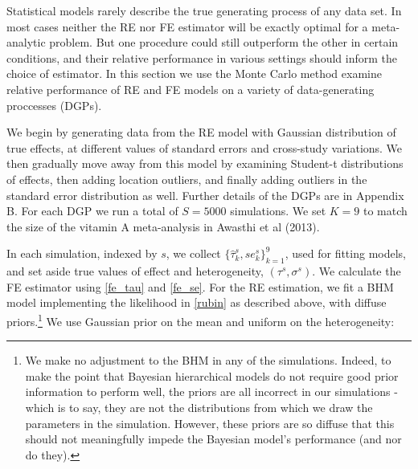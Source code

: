 \documentclass[12pt]{article}
\begin{document}
Statistical models rarely describe the true generating process of any data set. In most cases neither the RE nor FE estimator will be exactly optimal for a meta-analytic problem. But one procedure could still outperform the other in certain conditions, and their relative performance in various settings should inform the choice of estimator. In this section we use the Monte Carlo method examine relative performance of RE and FE models on a variety of data-generating proccesses (DGPs).

We begin by generating data from the RE model with Gaussian distribution of true effects, at different values of standard errors and cross-study variations. We then gradually move away from this model by examining Student-t distributions of effects, then adding location outliers, and finally adding outliers in the standard error distribution as well. Further details of the DGPs are in Appendix B. For each DGP we run a total of $S = 5000$ simulations. We set $K=9$ to match the size of the vitamin A meta-analysis in Awasthi et al (2013).

In each simulation, indexed by $s$, we collect $\{\hat{\tau}_k^s, se_k^s\}_{k=1}^9$, used for fitting models, and set aside true values of effect and heterogeneity, $(\tau^{s}, \sigma^{s})$. We calculate the FE estimator using \eqref{fe_tau} and \eqref{fe_se}. For the RE estimation, we fit a BHM model implementing the likelihood in \eqref{rubin} as described above, with diffuse priors.\footnote{We make no adjustment to the BHM in any of the simulations. Indeed, to make the point that Bayesian hierarchical models do not require good prior information to perform well, the priors are all incorrect in our simulations - which is to say, they are not the distributions from which we draw the parameters in the simulation. However, these priors are so diffuse that this should not meaningfully impede the Bayesian model's performance (and nor do they).} We use Gaussian prior on the mean and uniform on the heterogeneity:

% 
% 
\end{document}
